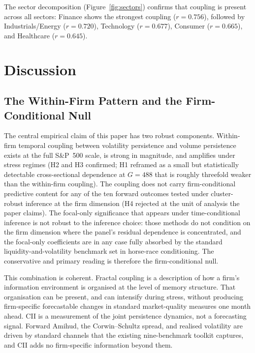 \documentclass[preprint,12pt,authoryear]{elsarticle}
\begin{document}
The sector decomposition (Figure~\ref{fig:sectors}) confirms that coupling is present across all sectors: Finance shows the strongest coupling ($r = 0.756$), followed by Industrials/Energy ($r = 0.720$), Technology ($r = 0.677$), Consumer ($r = 0.665$), and Healthcare ($r = 0.645$).

\section{Discussion}
\label{sec:discussion}

\subsection{The Within-Firm Pattern and the Firm-Conditional Null}

The central empirical claim of this paper has two robust components. Within-firm temporal coupling between volatility persistence and volume persistence exists at the full S\&P~500 scale, is strong in magnitude, and amplifies under stress regimes (H2 and H3 confirmed; H1 reframed as a small but statistically detectable cross-sectional dependence at $G = 488$ that is roughly threefold weaker than the within-firm coupling). The coupling does not carry firm-conditional predictive content for any of the ten forward outcomes tested under cluster-robust inference at the firm dimension (H4 rejected at the unit of analysis the paper claims). The focal-only significance that appears under time-conditional inference is not robust to the inference choice: those methods do not condition on the firm dimension where the panel's residual dependence is concentrated, and the focal-only coefficients are in any case fully absorbed by the standard liquidity-and-volatility benchmark set in horse-race conditioning. The conservative and primary reading is therefore the firm-conditional null.

This combination is coherent. Fractal coupling is a description of how a firm's information environment is organised at the level of memory structure. That organisation can be present, and can intensify during stress, without producing firm-specific forecastable changes in standard market-quality measures one month ahead. CII is a measurement of the joint persistence dynamics, not a forecasting signal. Forward Amihud, the Corwin--Schultz spread, and realised volatility are driven by standard channels that the existing nine-benchmark toolkit captures, and CII adds no firm-specific information beyond them.
\end{document}
